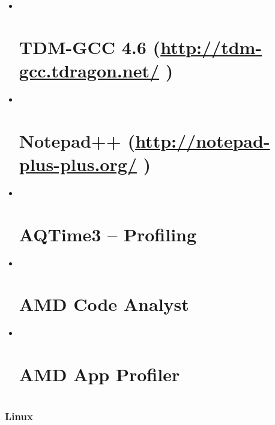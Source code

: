 \documentclass[a4paper,11pt,twoside,pdftex,draft]{article}
\begin{document}
\begin{itemize}
\item ~
  \hypertarget{tdm-gcc-4.6-httptdm-gcc.tdragon.net}{%
  \section[TDM-GCC 4.6 (\url{http://tdm-gcc.tdragon.net/}
  )]{\texorpdfstring{\protect\hypertarget{anchor-9}{}{}TDM-GCC 4.6
  (\url{http://tdm-gcc.tdragon.net/}
  )}{TDM-GCC 4.6 (http://tdm-gcc.tdragon.net/ )}}\label{tdm-gcc-4.6-httptdm-gcc.tdragon.net}}
\item ~
  \hypertarget{notepad-httpnotepad-plus-plus.org}{%
  \section{\texorpdfstring{Notepad++
  (\url{http://notepad-plus-plus.org/}
  )}{Notepad++ (http://notepad-plus-plus.org/ )}}\label{notepad-httpnotepad-plus-plus.org}}
\item ~
  \hypertarget{aqtime3-profiling}{%
  \section{AQTime3 -- Profiling}\label{aqtime3-profiling}}
\item ~
  \hypertarget{amd-code-analyst}{%
  \section{AMD Code Analyst}\label{amd-code-analyst}}
\item ~
  \hypertarget{amd-app-profiler}{%
  \section{AMD App Profiler}\label{amd-app-profiler}}

  \hypertarget{section-3}{%
  \section{}\label{section-3}}
\end{itemize}

\hypertarget{linux}{%
\subsubsection[Linux]{\texorpdfstring{\protect\hypertarget{anchor-10}{}{}Linux}{Linux}}\label{linux}}
\end{document}
